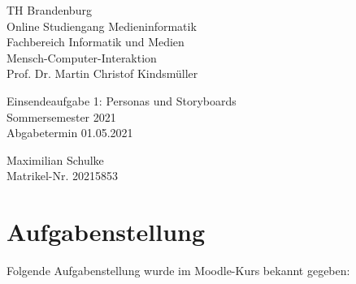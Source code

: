 \documentclass{article}
\begin{document}
\begin{titlepage}
	\begin{flushleft}
		TH Brandenburg \\
		Online Studiengang Medieninformatik \\
		Fachbereich Informatik und Medien \\
		Mensch-Computer-Interaktion \\
		Prof. Dr. Martin Christof Kindsmüller
	\end{flushleft}

	\vfill

	\begin{center}
		\Large{Einsendeaufgabe 1: Personas und Storyboards}\\[0.5em]
		\large{Sommersemester 2021}\\[0.25em]
		\large{Abgabetermin 01.05.2021}
	\end{center}

	\vfill

	\begin{flushright}
		Maximilian Schulke \\
		Matrikel-Nr. 20215853
	\end{flushright}
\end{titlepage}

\section{Aufgabenstellung}

Folgende Aufgabenstellung wurde im Moodle-Kurs bekannt gegeben:
\end{document}
